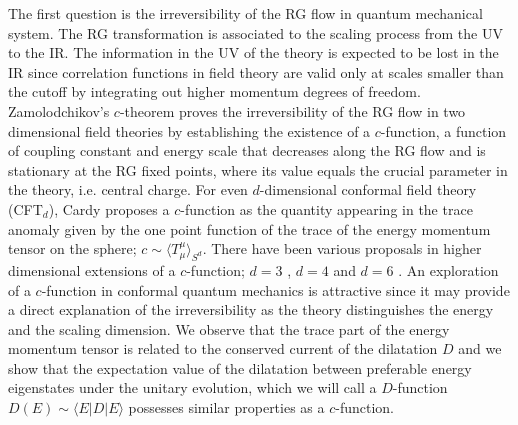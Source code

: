 \documentclass[12pt]{article}
\numberwithin{equation}{section}
\begin{document}
The first question is the irreversibility of the RG flow 
in quantum mechanical system. 
The RG transformation is associated 
to the scaling process from the UV to the IR. 
The information in the UV of the theory is expected to be lost in the IR 
since correlation functions in field theory 
are valid only at scales smaller than the cutoff by integrating out higher momentum degrees of freedom. 
Zamolodchikov's $c$-theorem \cite{Zamolodchikov:1986gt} 
proves the irreversibility of the RG flow in two dimensional field
theories by establishing the existence of a $c$-function, 
a function of coupling constant and energy scale 
that decreases along the RG flow 
and is stationary at the RG fixed points, 
where its value equals the crucial parameter 
in the theory, i.e. central charge. 
For even $d$-dimensional conformal field theory (CFT$_{d}$), 
Cardy \cite{Cardy:1988cwa} proposes a $c$-function 
as the quantity appearing in the trace anomaly 
given by the one point function 
of the trace of the energy momentum tensor on the sphere; 
$c\sim \langle T^{\mu}_{\mu}\rangle_{S^{d}}$. 
There have been various proposals 
in higher dimensional extensions of a $c$-function; 
$d=3$ \cite{Myers:2010tj,Jafferis:2010un,Casini:2011kv}, 
$d=4$ \cite{Komargodski:2011vj} 
and $d=6$ \cite{Elvang:2012st, Grinstein:2014xba}. 
An exploration of a $c$-function in conformal quantum mechanics 
is attractive since it may provide a direct explanation 
of the irreversibility 
as the theory distinguishes the energy and the scaling dimension. 
We observe that the trace part of the energy momentum tensor 
is related to the conserved current of the dilatation $D$ 
and we show that the expectation value 
of the dilatation between preferable energy eigenstates under the unitary evolution, 
which we will call a $D$-function $D(E)\sim \langle E|D|E\rangle$ 
possesses similar properties as a $c$-function. 
\end{document}
